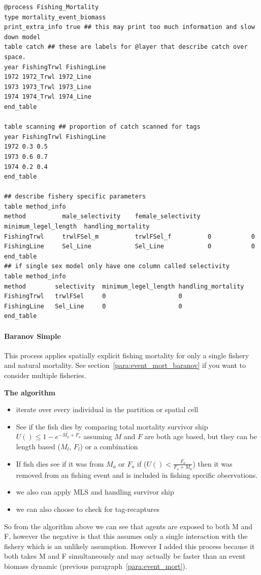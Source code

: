 \pagebreak
{\small{\begin{verbatim}
@process Fishing_Mortality
type mortality_event_biomass
print_extra_info true ## this may print too much information and slow down model
table catch ## these are labels for @layer that describe catch over space.
year FishingTrwl FishingLine
1972 1972_Trwl 1972_Line
1973 1973_Trwl 1973_Line
1974 1974_Trwl 1974_Line
end_table

table scanning ## proportion of catch scanned for tags
year FishingTrwl FishingLine
1972 0.3 0.5
1973 0.6 0.7
1974 0.2 0.4
end_table

## describe fishery specific parameters		
table method_info
method          male_selectivity    female_selectivity 	minimum_legel_length  handling_mortality
FishingTrwl     trwlFSel_m          trwlFSel_f			0			0
FishingLine	    Sel_Line            Sel_Line			0			0
end_table
## if single sex model only have one column called selectivity
table method_info
method        selectivity  minimum_legel_length handling_mortality
FishingTrwl   trwlFSel     0                    0
FishingLine   Sel_Line     0                    0
end_table
\end{verbatim}}}


\paragraph{ Baranov Simple}\label{para:baranov_simple}
This process applies spatially explicit fishing mortality for only a single fishery and natural mortality. See section~\ref{para:event_mort_baranov} if you want to consider multiple fisheries.

\textbf{The algorithm}
\begin{itemize}
	\item iterate over every individual in the partition or spatial cell
	\item See if the fish dies by comparing total mortality survivor ship $U() \leq 1 - e^{- M_a + F_a}$ assuming $M$ and $F$ are both age based, but they can be length based ($M_l$, $F_l$) or a combination
	\item If fish dies see if it was from $M_a$ or $F_a$ if ($U() < \frac{F_a}{F_a + M_a}$) then it was removed from an fishing event and is included in fishing specific observations.
	\item we also can apply MLS and handling survivor ship
	\item we can also choose to check for tag-recaptures
\end{itemize}
So from the algorithm above we can see that agents are exposed to both M and F, however the negative is that this assumes only a single interaction with the fishery which is an unlikely assumption. However I added this process because it both takes M and F simultaneously and may actually be faster than an event biomass dynamic (previous paragraph~\ref{para:event_mort}).


